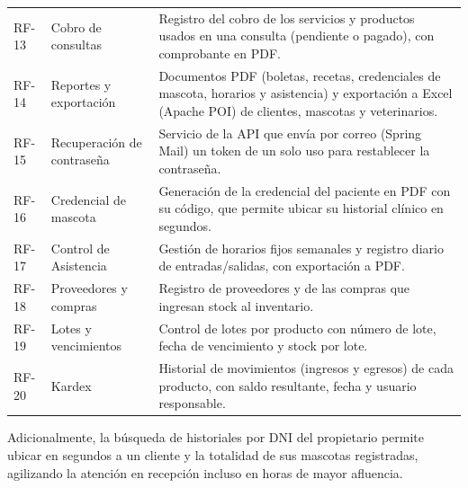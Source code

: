 \documentclass[11pt,a4paper]{report}
\begin{document}
\begin{longtable}{@{}p{1.5cm} p{3.5cm} p{10.0cm}@{}}
\addlinespace
RF-13 & Cobro de consultas & Registro del cobro de los servicios y productos usados en una consulta (pendiente o pagado), con comprobante en PDF. \\
\addlinespace
RF-14 & Reportes y exportación & Documentos PDF (boletas, recetas, credenciales de mascota, horarios y asistencia) y exportación a Excel (Apache POI) de clientes, mascotas y veterinarios. \\
\addlinespace
RF-15 & Recuperación de contraseña & Servicio de la API que envía por correo (Spring Mail) un token de un solo uso para restablecer la contraseña. \\
\addlinespace
RF-16 & Credencial de mascota & Generación de la credencial del paciente en PDF con su código, que permite ubicar su historial clínico en segundos. \\
\addlinespace
RF-17 & Control de Asistencia & Gestión de horarios fijos semanales y registro diario de entradas/salidas, con exportación a PDF. \\
\addlinespace
RF-18 & Proveedores y compras & Registro de proveedores y de las compras que ingresan stock al inventario. \\
\addlinespace
RF-19 & Lotes y vencimientos & Control de lotes por producto con número de lote, fecha de vencimiento y stock por lote. \\
\addlinespace
RF-20 & Kardex & Historial de movimientos (ingresos y egresos) de cada producto, con saldo resultante, fecha y usuario responsable. \\
\end{longtable}

Adicionalmente, la búsqueda de historiales por DNI del propietario permite ubicar en segundos a un cliente y la totalidad de sus mascotas registradas, agilizando la atención en recepción incluso en horas de mayor afluencia.
\end{document}
